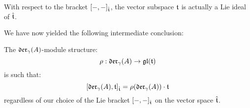         \begin{corollary} \label{coro: toroidal_lie_algebras_are_ideals}
            With respect to the bracket $[-, -]_{\hat{\mathfrak{t}}}$, the vector subspace $\mathfrak{t}$ is actually a Lie ideal of $\hat{\mathfrak{t}}$.
        \end{corollary}

        We have now yielded the following intermediate conclusion:
        \begin{proposition} \label{prop: toroidal_lie_algebras_as_modules_over_div_zero_vector_field_lie_algebras}
            The $\mathfrak{der}_{\gamma}(A)$-module structure:
                $$\rho: \mathfrak{der}_{\gamma}(A) \to \mathfrak{gl}(\mathfrak{t})$$
            is such that:
                $$[\mathfrak{der}_{\gamma}(A), \mathfrak{t}]_{\hat{\mathfrak{t}}} = \rho(\mathfrak{der}_{\gamma}(A)) \cdot \mathfrak{t}$$
            regardless of our choice of the Lie bracket $[-, -]_{\hat{\mathfrak{t}}}$ on the vector space $\hat{\mathfrak{t}}$.
        \end{proposition}

